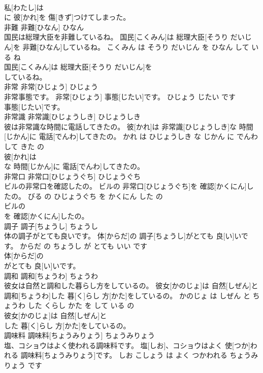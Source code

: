 \documentclass[8pt]{extreport}
\begin{document}
\begin{CJK}{UTF8}{min}
\\	私[わたし]は
\\	に 彼[かれ]を 傷[きず]つけてしまった。			
\\	非難	非難[ひなん]	ひなん	
\\	国民は総理大臣を非難しているね。	国民[こくみん]は 総理大臣[そうり だいじん]を 非難[ひなん]しているね。	こくみん は そうり だいじん を ひなん して いる ね	
\\	国民[こくみん]は 総理大臣[そうり だいじん]を
\\	しているね。			
\\	非常	非常[ひじょう]	ひじょう	
\\	非常事態です。	非常[ひじょう] 事態[じたい]です。	ひじょう じたい です	
\\	事態[じたい]です。			
\\	非常識	非常識[ひじょうしき]	ひじょうしき	
\\	彼は非常識な時間に電話してきたの。	彼[かれ]は 非常識[ひじょうしき]な 時間[じかん]に 電話[でんわ]してきたの。	かれ は ひじょうしき な じかん に でんわ して きた の	
\\	彼[かれ]は
\\	な 時間[じかん]に 電話[でんわ]してきたの。			
\\	非常口	非常口[ひじょうぐち]	ひじょうぐち	
\\	ビルの非常口を確認したの。	ビルの 非常口[ひじょうぐち]を 確認[かくにん]したの。	びる の ひじょうぐち を かくにん した の	
\\	ビルの
\\	を 確認[かくにん]したの。			
\\	調子	調子[ちょうし]	ちょうし	
\\	体の調子がとても良いです。	体[からだ]の 調子[ちょうし]がとても 良[い]いです。	からだ の ちょうし が とても いい です	
\\	体[からだ]の
\\	がとても 良[い]いです。			
\\	調和	調和[ちょうわ]	ちょうわ	
\\	彼女は自然と調和した暮らし方をしているの。	彼女[かのじょ]は 自然[しぜん]と 調和[ちょうわ]した 暮[く]らし 方[かた]をしているの。	かのじょ は しぜん と ちょうわ した くらし かた を して いる の	
\\	彼女[かのじょ]は 自然[しぜん]と
\\	した 暮[く]らし 方[かた]をしているの。			
\\	調味料	調味料[ちょうみりょう]	ちょうみりょう	
\\	塩、コショウはよく使われる調味料です。	塩[しお]、コショウはよく 使[つか]われる 調味料[ちょうみりょう]です。	しお こしょう は よく つかわれる ちょうみりょう です	

\end{CJK}
\end{document}
